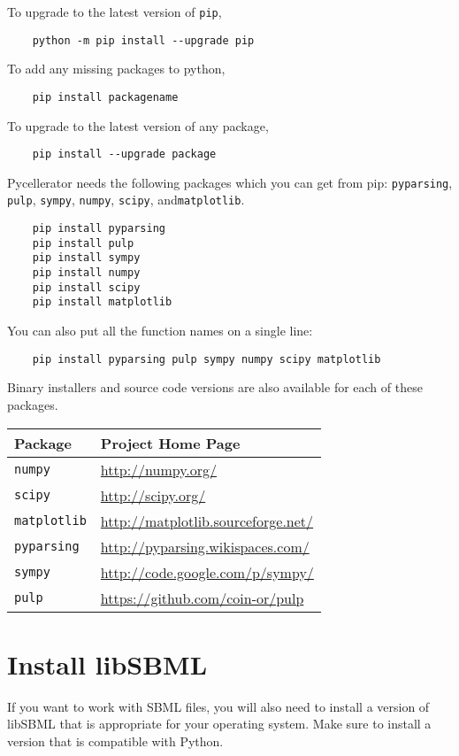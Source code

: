To upgrade to the latest version of {\tt pip},
\begin{lstlisting}
    python -m pip install --upgrade pip
\end{lstlisting}
To add any missing packages to python, 
\begin{lstlisting}
    pip install packagename
\end{lstlisting}
To upgrade to the latest version of any package,
\begin{lstlisting}
    pip install --upgrade package
\end{lstlisting}
Pycellerator needs the following packages which you can get from pip: {\tt pyparsing}, {\tt pulp}, {\tt sympy}, {\tt numpy}, {\tt scipy}, and{\tt matplotlib}.
\begin{lstlisting}
    pip install pyparsing
    pip install pulp
    pip install sympy
    pip install numpy
    pip install scipy
    pip install matplotlib
\end{lstlisting}
You can also put all the function names on a single line:
\begin{lstlisting}
    pip install pyparsing pulp sympy numpy scipy matplotlib
\end{lstlisting}
Binary installers and source code versions are also available for each of these packages. 

\begin{center}
\begin{tabular}{|ll|}
\hline
\textbf{Package} & \textbf{Project Home Page} \\ 
\hline
{\tt numpy} & \url{http://numpy.org/}\\
{\tt scipy} & \url{http://scipy.org/}\\
{\tt matplotlib}  & \url{http://matplotlib.sourceforge.net/}\\
{\tt pyparsing} & \url{http://pyparsing.wikispaces.com/} \\
{\tt sympy} &  \url{http://code.google.com/p/sympy/} \\
{\tt pulp} & \url{https://github.com/coin-or/pulp}\\

\hline
\end{tabular}
\end{center}


\section{Install libSBML}

If you want to work with SBML files, you will also need to install a version of libSBML that is appropriate for your operating system. Make sure to install a version that is compatible with Python. 


